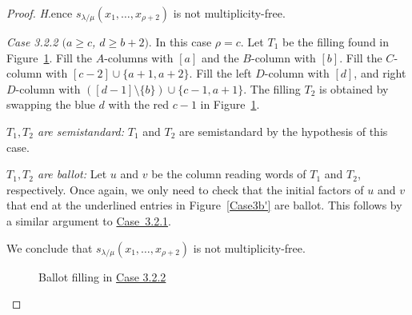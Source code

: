 \documentclass[10pt]{article}
\theoremstyle{definition}
\let\hypertargeta\hypertarget %
\let\hyperlinka\hyperlink %
\newenvironment{Case}[1]{\par\vskip2pt\noindent%
\emph{#1}.}{\vskip2pt}
\begin{document}
\begin{proof}
\begin{Case}
Hence $s_{\lambda/\mu}(x_1,\ldots,x_{\rho+2})$ is not multiplicity-free.


\end{Case}

\begin{Case}
{\hypertargeta{theo3.13_case3.2.2}{Case 3.2.2} $(a\geq c$, $d\geq b+2)$} 
In this case $\rho = c$. Let $T_1$ be the filling found in Figure~\ref{Case3b''}. Fill the $A$-columns with $[a]$ and the $B$-column with $[b]$. Fill the $C$-column with $[c-2]\cup \{ a+1, a+2\}$. Fill the left $D$-column with $[d]$, and right $D$-column with $([d-1]\setminus\{b\})\cup\{ c-1, a+1\}$. The filling $T_2$ is obtained by swapping the blue $d$ with the red $c-1$ in Figure~\ref{Case3b''}.

\emph{$T_1,T_2$ are semistandard:} $T_1$ and $T_2$ are semistandard by the hypothesis of this case.

\emph{$T_1,T_2$ are ballot:} Let $u$ and $v$ be the column reading words of $T_1$ and $T_2$, respectively. Once again, we only need to check that the initial factors of $u$ and $v$ that end at the underlined entries in Figure~\ref{Case3b'} are ballot. This follows by a similar argument to \hyperlinka{theo3.13_case3.2.1}{Case~3.2.1}.

We conclude that $s_{\lambda/\mu}(x_1,\ldots,x_{\rho+2})$ is not multiplicity-free.

\begin{figure}[htb]\centering
 \caption[Ballot filling in Case 3.2.2]{Ballot filling in \hyperlinka{theo3.13_case3.2.2}{Case 3.2.2}}
 \label{Case3b''}
\end{figure}



\end{Case}
\end{proof}
\end{document}
